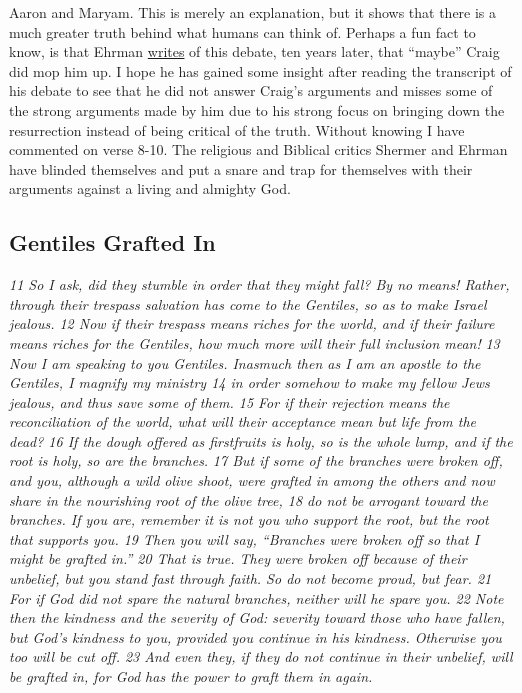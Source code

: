 Aaron and Maryam. This is merely an explanation, but it shows that there
is a much greater truth behind what humans can think of. Perhaps a fun
fact to know, is that Ehrman
\href{https://ehrmanblog.org/ehrman-vs-craig-evidence-for-resurrection}{writes}
of this debate, ten years later, that ``maybe'' Craig did mop him up. I
hope he has gained some insight after reading the transcript of his
debate to see that he did not answer Craig's arguments and misses some
of the strong arguments made by him due to his strong focus on bringing
down the resurrection instead of being critical of the truth. Without
knowing I have commented on verse 8-10. The religious and Biblical
critics Shermer and Ehrman have blinded themselves and put a snare and
trap for themselves with their arguments against a living and almighty
God.

\subsection{Gentiles Grafted In} \emph{11 So I ask, did they stumble in
order that they might fall? By no means! Rather, through their trespass
salvation has come to the Gentiles, so as to make Israel jealous. 12 Now
if their trespass means riches for the world, and if their failure means
riches for the Gentiles, how much more will their full inclusion mean!}
\emph{13 Now I am speaking to you Gentiles. Inasmuch then as I am an
apostle to the Gentiles, I magnify my ministry 14 in order somehow to
make my fellow Jews jealous, and thus save some of them. 15 For if their
rejection means the reconciliation of the world, what will their
acceptance mean but life from the dead? 16 If the dough offered as
firstfruits is holy, so is the whole lump, and if the root is holy, so
are the branches.} \emph{17 But if some of the branches were broken off,
and you, although a wild olive shoot, were grafted in among the others
and now share in the nourishing root of the olive tree, 18 do not be
arrogant toward the branches. If you are, remember it is not you who
support the root, but the root that supports you. 19 Then you will say,
``Branches were broken off so that I might be grafted in.'' 20 That is
true. They were broken off because of their unbelief, but you stand fast
through faith. So do not become proud, but fear. 21 For if God did not
spare the natural branches, neither will he spare you. 22 Note then the
kindness and the severity of God: severity toward those who have fallen,
but God's kindness to you, provided you continue in his kindness.
Otherwise you too will be cut off. 23 And even they, if they do not
continue in their unbelief, will be grafted in, for God has the power to
graft them in again.}

